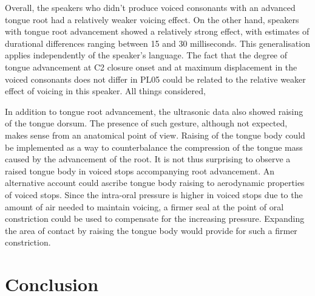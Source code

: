 \documentclass[authoryear, twocolumn]{elsarticle}
\begin{document}
Overall, the speakers who didn't produce voiced consonants with an
advanced tongue root had a relatively weaker voicing effect. On the
other hand, speakers with tongue root advancement showed a relatively
strong effect, with estimates of durational differences ranging between
15 and 30 milliseconds. This generalisation applies independently of the
speaker's language. The fact that the degree of tongue advancement at C2
closure onset and at maximum displacement in the voiced consonants does
not differ in PL05 could be related to the relative weaker effect of
voicing in this speaker. All things considered,

In addition to tongue root advancement, the ultrasonic data also showed
raising of the tongue dorsum. The presence of such gesture, although not
expected, makes sense from an anatomical point of view. Raising of the
tongue body could be implemented as a way to counterbalance the
compression of the tongue mass caused by the advancement of the root. It
is not thus surprising to observe a raised tongue body in voiced stops
accompanying root advancement. An alternative account could ascribe
tongue body raising to aerodynamic properties of voiced stops. Since the
intra-oral pressure is higher in voiced stops due to the amount of air
needed to maintain voicing, a firmer seal at the point of oral
constriction could be used to compensate for the increasing pressure.
Expanding the area of contact by raising the tongue body would provide
for such a firmer constriction.

\section{Conclusion}
\label{s:conclusion}


\end{document}
